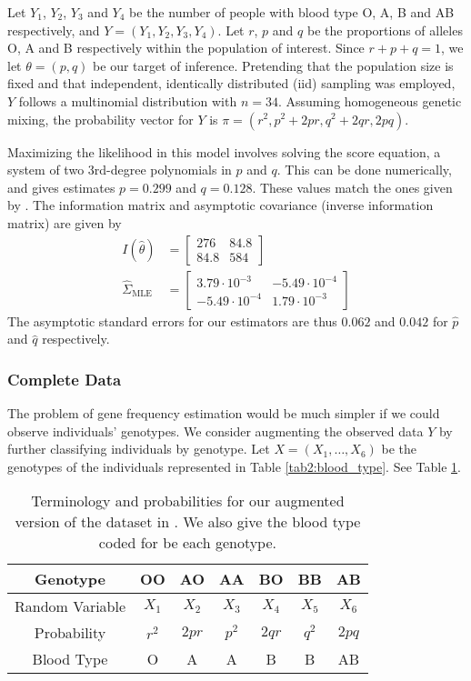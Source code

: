 \documentclass[11pt, oneside]{article}   	%
\begin{document}
Let $Y_1$, $Y_2$, $Y_3$ and $Y_4$ be the number of people with blood type O, A, B and AB respectively, and $Y = (Y_1, Y_2, Y_3, Y_4)$. Let $r$, $p$ and $q$ be the proportions of alleles O, A and B respectively within the population of interest. Since $r + p + q = 1$, we let $\theta = (p, q)$ be our target of inference. Pretending that the population size is fixed and that independent, identically distributed (iid) sampling was employed, $Y$ follows a multinomial distribution with $n = 34$. Assuming homogeneous genetic mixing, the probability vector for $Y$ is $\pi = (r^2, p^2 + 2pr, q^2 + 2qr, 2pq)$.

Maximizing the likelihood in this model involves solving the score equation, a system of two 3rd-degree polynomials in $p$ and $q$. This can be done numerically, and gives estimates $p = 0.299$ and $q = 0.128$. These values match the ones given by \citet{Fuj78}. The information matrix and asymptotic covariance (inverse information matrix) are given by
%
\begin{align}
    I(\hat{\theta}) &= \begin{bmatrix}
        276 & 84.8\\
        84.8 & 584
    \end{bmatrix}\\
    \hat{\Sigma}_\mathrm{MLE} &= \begin{bmatrix}
        3.79 \cdot 10^{-3} & -5.49 \cdot 10^{-4}\\
        -5.49 \cdot 10^{-4} & 1.79 \cdot 10^{-3}
    \end{bmatrix} \label{eq:obs_lik_SE}
\end{align}
%
The asymptotic standard errors for our estimators are thus $0.062$ and $0.042$ for $\hat{p}$ and $\hat{q}$ respectively.

\subsubsection{Complete Data}

The problem of gene frequency estimation would be much simpler if we could observe individuals' genotypes. We consider augmenting the observed data $Y$ by further classifying individuals by genotype. Let $X = (X_1, \ldots, X_6)$ be the genotypes of the individuals represented in Table \ref{tab2:blood_type}. See Table \ref{tab2:blood_type_complete}.

\begin{table}
    \centering
    \caption{Terminology and probabilities for our augmented version of the dataset in \citet{Fuj78}. We also give the blood type coded for be each genotype.}
    \begin{tabular}{c|cccccc}
        Genotype & OO & AO & AA & BO & BB & AB\\
        \hline
        Random Variable & $X_1$ & $X_2$ & $X_3$ & $X_4$ & $X_5$ & $X_6$\\
        Probability & $r^2$ & $2pr$ & $p^2$ & $2qr$ & $q^2$ & $2pq$\\
        Blood Type & O & A & A & B & B & AB
    \end{tabular}
    
    \label{tab2:blood_type_complete}
\end{table}
\end{document}
